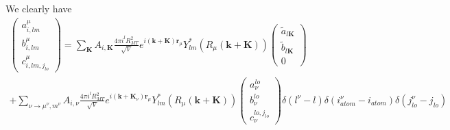 \documentclass[aps,prb,floatfix,epsfig,singlecolumn,showpacs,preprintnumbers]{revtex4}
\renewcommand{\vr}{{\mathbf{r}}}
\newcommand{\vk}{{\mathbf{k}}}
\newcommand{\vK}{{\mathbf{K}}}
\begin{document}
We clearly have
\begin{eqnarray}
\left(
\begin{array}{c}
a_{i,lm}^\mu \\
b_{i,lm}^\mu \\
c_{i,lm,j_{lo}}^\mu
\end{array}
\right)=
\sum_\vK A_{i,\vK}
\frac{4\pi i^l R_{MT}^2}{\sqrt{V}}e^{i(\vk+\vK)\vr_{\mu}}Y^*_{lm}(R_{\mu}(\vk+\vK))  
\left(
\begin{array}{c}
\tilde{a}_{l\vK}\\
\tilde{b}_{l\vK}\\
0
\end{array}
\right)
\nonumber\\
+
\sum_{\nu\rightarrow{\mu^\nu,m^\nu}} A_{i,\nu}
\frac{4\pi i^l R_{MT}^2}{\sqrt{V}}e^{i(\vk+\vK_\nu)\vr_{\mu}}Y^*_{lm}(R_{\mu}(\vk+\vK))  
\left(
\begin{array}{c}
a^{lo}_\nu\\
b^{lo}_\nu\\
c^{lo,j_{lo}}_\nu
\end{array}
\right)\delta(l^\nu-l)\delta(i_{atom}^\nu-i_{atom})\delta(j_{lo}^\nu-j_{lo})
\end{eqnarray}
\end{document}
